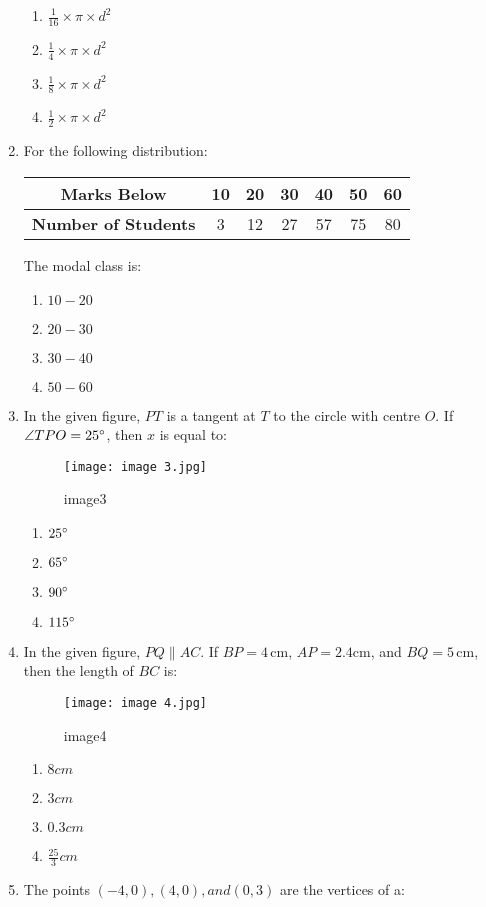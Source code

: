 \documentclass{article}
\begin{document}
\begin{enumerate}
\begin{enumerate}
    \item $\frac{1}{16} \times \pi \times d^2$
    \item $\frac{1}{4} \times \pi \times d^2$
    \item $\frac{1}{8} \times \pi \times d^2$
    \item $\frac{1}{2} \times \pi \times d^2$
\end{enumerate}
\item For the following distribution:

\begin{center}
\begin{tabular}{|c|c|c|c|c|c|c|}
\hline
\textbf{Marks Below} & 10 & 20 & 30 & 40 & 50 & 60 \\
\hline
\textbf{Number of Students} & 3 & 12 & 27 & 57 & 75 & 80 \\
\hline
\end{tabular}
\end{center}

The modal class is:

\begin{enumerate}
    \item $10-20$
    \item $20-30$
    \item $30-40$
    \item $50-60$
\end{enumerate}
\newpage
\item In the given figure, $PT$ is a tangent at $T$ to the circle with centre \(O\). If $\angle TPO = 25\degree$, then $x$ is equal to:
\begin{figure}[h!]
\centering
\texttt{[image: image 3.jpg]}
\label{fig:image1}
        \caption{image3}
\end{figure}
\begin{enumerate}
    \item $25\degree$
    \item $65\degree$
    \item $90\degree$
    \item $115\degree$
\end{enumerate}
\newpage
\item In the given figure, $PQ \parallel AC$. If $BP = 4 \, \text{cm}$, $AP = 2.4 \text{cm}$, and $BQ = 5 \, \text{cm}$, then the length of $BC$ is:
\begin{figure}[h!]
\centering
\texttt{[image: image 4.jpg]}
\label{fig:image1}                                                  \caption{image4}                                    
\end{figure}
	\begin{enumerate}
    \item $8 cm$
    \item $3 cm$
    \item $0.3 cm$
    \item $\frac{25}{3} cm$
\end{enumerate}
\item The points $(-4,0), (4,0), and (0,3)$ are the vertices of a:


\end{enumerate}
\end{document}
